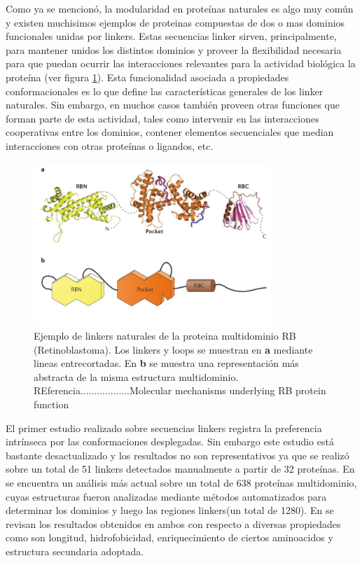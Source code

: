 Como ya se mencionó, la modularidad en proteínas naturales es algo muy común y existen muchisimos ejemplos de proteinas compuestas de dos o mas dominios funcionales unidas por linkers.
Estas secuencias linker sirven, principalmente, para mantener unidos los distintos dominios y proveer la flexibilidad necesaria para que puedan ocurrir las interacciones relevantes para la actividad biológica la proteína
(ver figura \ref{multidomainRb}).
Esta funcionalidad asociada a propiedades conformacionales es lo que define las características generales de los linker naturales. 
Sin embargo, en muchos casos también proveen otras funciones que forman parte de esta actividad, tales como intervenir en las interacciones cooperativas entre los dominios, 
contener elementos secuenciales que median interacciones con otras proteínas o ligandos, etc.

\begin{figure}[htbp,centered]
\centering
\includegraphics[width=0.8\textwidth]{img/multidomainRb.png} 
\caption{Ejemplo de linkers naturales de la proteina multidominio RB (Retinoblastoma). Los linkers y loops se muestran en \textbf{a} mediante lineas entrecortadas. En \textbf{b} se muestra una representación más abstracta de la misma estructura multidominio.
REferencia..................Molecular mechanisms underlying RB protein function} 
\label{multidomainRb}
\end{figure}


El primer estudio realizado sobre secuencias linkers registra la preferencia intrínseca por las conformaciones desplegadas\cite{argos1990investigation}.   
Sin embargo este estudio está bastante desactualizado y los resultados no son representativos ya que se realizó sobre un total de 51 linkers detectados manualmente a partir de 32 proteínas.
En \cite{george2002analysis} se encuentra un análisis más actual sobre un total de 638 proteínas multidominio, cuyas estructuras fueron analizadas mediante métodos automatizados 
para determinar los dominios y luego las regiones linkers(un total de 1280).
En \cite{chen2013fusion} se revisan los resultados obtenidos en ambos con respecto a diversas propiedades como son longitud, hidrofobicidad, enriquecimiento de ciertos aminoacidos y estructura secundaria adoptada.


